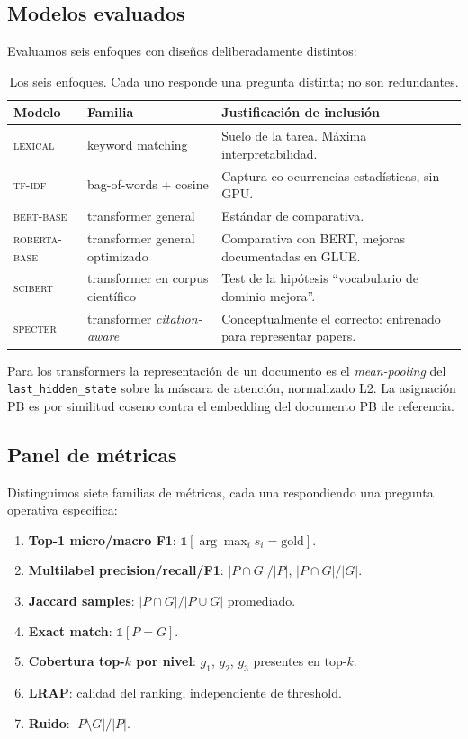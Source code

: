 \documentclass[11pt,a4paper]{article}
\begin{document}
\subsection{Modelos evaluados}

Evaluamos seis enfoques con diseños deliberadamente distintos:

\begin{table}[h]
\centering\small
\begin{tabularx}{\linewidth}{l l X}
\toprule
\textbf{Modelo} & \textbf{Familia} & \textbf{Justificación de inclusión} \\
\midrule
\textsc{lexical} & keyword matching & Suelo de la tarea. Máxima interpretabilidad. \\
\textsc{tf-idf} & bag-of-words + cosine & Captura co-ocurrencias estadísticas, sin GPU. \\
\textsc{bert-base} \cite{devlin2019bert} & transformer general & Estándar de comparativa. \\
\textsc{roberta-base} \cite{liu2019roberta} & transformer general optimizado & Comparativa con BERT, mejoras documentadas en GLUE. \\
\textsc{scibert} \cite{beltagy2019scibert} & transformer en corpus científico & Test de la hipótesis ``vocabulario de dominio mejora''. \\
\textsc{specter} \cite{cohan2020specter} & transformer \emph{citation-aware} & Conceptualmente el correcto: entrenado para representar papers. \\
\bottomrule
\end{tabularx}
\caption{Los seis enfoques. Cada uno responde una pregunta distinta; no son redundantes.}
\end{table}

Para los transformers la representación de un documento es el \emph{mean-pooling} del \texttt{last\_hidden\_state} sobre la máscara de atención, normalizado L2. La asignación PB es por similitud coseno contra el embedding del documento PB de referencia.

\subsection{Panel de métricas}

Distinguimos siete familias de métricas, cada una respondiendo una pregunta operativa específica:

\begin{enumerate}
\item \textbf{Top-1 micro/macro F1}: $\mathbb{1}[\arg\max_i s_i = \text{gold}]$.
\item \textbf{Multilabel precision/recall/F1}: $|P \cap G|/|P|$, $|P \cap G|/|G|$.
\item \textbf{Jaccard samples}: $|P \cap G|/|P \cup G|$ promediado.
\item \textbf{Exact match}: $\mathbb{1}[P = G]$.
\item \textbf{Cobertura top-$k$ por nivel}: $g_1$, $g_2$, $g_3$ presentes en top-$k$.
\item \textbf{LRAP}: calidad del ranking, independiente de threshold.
\item \textbf{Ruido}: $|P \setminus G|/|P|$.
\end{enumerate}
\end{document}
